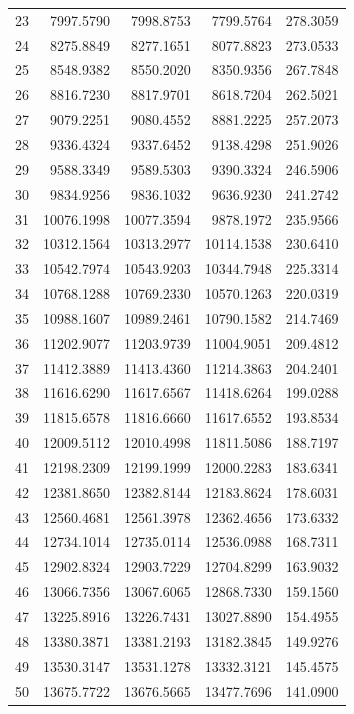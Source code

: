 \documentclass[11pt]{article}
\begin{document}
\begin{longtable}{r r r r r}
23 & 7997.5790 & 7998.8753 & 7799.5764 & 278.3059 \\
24 & 8275.8849 & 8277.1651 & 8077.8823 & 273.0533 \\
25 & 8548.9382 & 8550.2020 & 8350.9356 & 267.7848 \\
26 & 8816.7230 & 8817.9701 & 8618.7204 & 262.5021 \\
27 & 9079.2251 & 9080.4552 & 8881.2225 & 257.2073 \\
28 & 9336.4324 & 9337.6452 & 9138.4298 & 251.9026 \\
29 & 9588.3349 & 9589.5303 & 9390.3324 & 246.5906 \\
30 & 9834.9256 & 9836.1032 & 9636.9230 & 241.2742 \\
31 & 10076.1998 & 10077.3594 & 9878.1972 & 235.9566 \\
32 & 10312.1564 & 10313.2977 & 10114.1538 & 230.6410 \\
33 & 10542.7974 & 10543.9203 & 10344.7948 & 225.3314 \\
34 & 10768.1288 & 10769.2330 & 10570.1263 & 220.0319 \\
35 & 10988.1607 & 10989.2461 & 10790.1582 & 214.7469 \\
36 & 11202.9077 & 11203.9739 & 11004.9051 & 209.4812 \\
37 & 11412.3889 & 11413.4360 & 11214.3863 & 204.2401 \\
38 & 11616.6290 & 11617.6567 & 11418.6264 & 199.0288 \\
39 & 11815.6578 & 11816.6660 & 11617.6552 & 193.8534 \\
40 & 12009.5112 & 12010.4998 & 11811.5086 & 188.7197 \\
41 & 12198.2309 & 12199.1999 & 12000.2283 & 183.6341 \\
42 & 12381.8650 & 12382.8144 & 12183.8624 & 178.6031 \\
43 & 12560.4681 & 12561.3978 & 12362.4656 & 173.6332 \\
44 & 12734.1014 & 12735.0114 & 12536.0988 & 168.7311 \\
45 & 12902.8324 & 12903.7229 & 12704.8299 & 163.9032 \\
46 & 13066.7356 & 13067.6065 & 12868.7330 & 159.1560 \\
47 & 13225.8916 & 13226.7431 & 13027.8890 & 154.4955 \\
48 & 13380.3871 & 13381.2193 & 13182.3845 & 149.9276 \\
49 & 13530.3147 & 13531.1278 & 13332.3121 & 145.4575 \\
50 & 13675.7722 & 13676.5665 & 13477.7696 & 141.0900 \\

\end{longtable}
\end{document}
